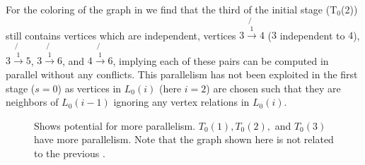 For the \DONE coloring of the graph in  we find that the third \levelGroup of the initial stage (T$_0$(2)) still contains vertices which are \DONE independent, \eg vertices $3 \not{\xrightarrow{1}} 4$ ($3$  \DONE independent to $4$), $3 \not{\xrightarrow{1}} 5$, $3 \not{\xrightarrow{1}} 6$, and $4 \not{\xrightarrow{1}} 6$, implying each of these pairs can be computed in parallel without any \DONE conflicts. This parallelism has not been exploited in the first stage ($s=0$)  as vertices in $L_0(i)$ (here $i=2$) are chosen such that they are \DONE neighbors of \level $L_0(i-1)$ ignoring any vertex relations in $L_0(i)$. 
     \begin{figure}[t]
     	\centering
     	\hspace{1.5em}
     	\hspace{1.5em}
        \caption{Shows potential for more parallelism. $T_0(1),T_0(2),$ and $T_0(3)$ have more parallelism. Note that the graph shown here is not related to the previous \stex.}
     	\label{fig:rec_d1_s1}
     \end{figure}

